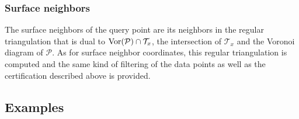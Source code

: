 \subsubsection{Surface neighbors}

The surface neighbors of the query point are its neighbors in the
regular triangulation that is dual to ${\rm Vor}(\mathcal{P}) \cap
\mathcal{T}_x$, the intersection of $\mathcal{T}_x$ and the Voronoi
diagram of $\mathcal{P}$. As for surface neighbor coordinates, this
regular triangulation is computed and the same kind of filtering of
the data points as well as the certification described above is
provided.


\subsection{Examples}

